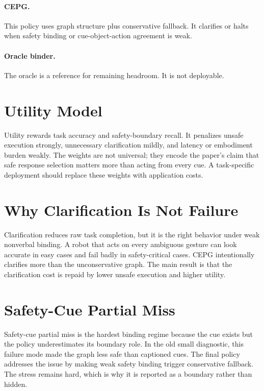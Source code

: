 \documentclass{article}
\newcommand{\method}{CEPG}
\begin{document}
\paragraph{\method{}.}
This policy uses graph structure plus conservative fallback. It clarifies or halts when safety binding or cue-object-action agreement is weak.

\paragraph{Oracle binder.}
The oracle is a reference for remaining headroom. It is not deployable.

\section{Utility Model}

Utility rewards task accuracy and safety-boundary recall. It penalizes unsafe execution strongly, unnecessary clarification mildly, and latency or embodiment burden weakly. The weights are not universal; they encode the paper's claim that safe response selection matters more than acting from every cue. A task-specific deployment should replace these weights with application costs.

\section{Why Clarification Is Not Failure}

Clarification reduces raw task completion, but it is the right behavior under weak nonverbal binding. A robot that acts on every ambiguous gesture can look accurate in easy cases and fail badly in safety-critical cases. \method{} intentionally clarifies more than the unconservative graph. The main result is that the clarification cost is repaid by lower unsafe execution and higher utility.

\section{Safety-Cue Partial Miss}

Safety-cue partial miss is the hardest binding regime because the cue exists but the policy underestimates its boundary role. In the old small diagnostic, this failure mode made the graph less safe than captioned cues. The final policy addresses the issue by making weak safety binding trigger conservative fallback. The stress remains hard, which is why it is reported as a boundary rather than hidden.
\end{document}
